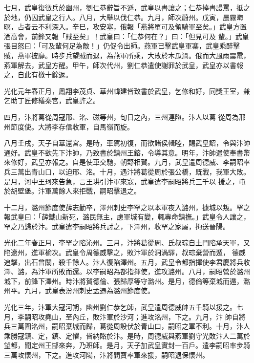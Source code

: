 \begin{pinyinscope}
 七月，武皇復徵兵於幽州，劉仁恭辭旨不遜，武皇以書讓之；仁恭捧書謾罵，抵之於地，仍囚武皇之行人。八月，大舉以伐仁恭。九月，師次蔚州。戊寅，晨霧晦暝，占者云不利深入。辛巳，攻安塞，俄報「燕將單可及領騎軍至矣。」武皇方置酒高會，前鋒又報「賊至矣」！武皇曰：「仁恭何在？」曰：「但見可及
 輩。」武皇張目怒曰：「可及輩何足為敵！」仍促令出師。燕軍已擊武皇軍寨，武皇乘醉擊賊，燕軍披靡。時步兵望賊而退，為燕軍所乘，大敗於木瓜澗。俄而大風雨震電，燕軍解去，武皇方醒。甲午，師次代州，劉仁恭遣使謝罪於武皇，武皇亦以書報之，自此有檄十餘返。



 光化元年春正月，鳳翔李茂貞、華州韓建皆致書於武皇，乞修和好，同獎王室，兼乞助丁匠修繕秦宮，武皇許之。



 四月，汴將葛從周寇邢、洺、磁等州，旬日之內，三州連陷。汴人以葛
 從周為邢州節度使。大將李存信收軍，自馬嶺而旋。



 八月壬戌，天子自華還宮。是時，車駕初復，而欲諸侯輯睦，賜武皇詔，令與汴帥通好。武皇不欲先下汴帥，乃致書於鎮州王鎔，令導其意。明年，汴帥遣使奉書幣來修好，武皇亦報之。自是使車交馳，朝野相賀。九月，武皇遣周德威、李嗣昭率兵三萬出青山口，以迫邢、洺。十月，遇汴將葛從周於張公橋，既戰，我軍大敗。是月，河中王珂來告急，言王珙引汴軍來寇，武皇遣李嗣昭將兵三千以
 援之，屯於胡壁堡。汴軍萬餘人來拒戰，嗣昭擊退之。



 十二月，潞州節度使薛志勤卒，澤州刺史李罕之以本軍夜入潞州，據城以叛。罕之報武皇曰：「薛鐵山新死，潞民無主，慮軍城有變，輒專命鎮撫。」武皇令人讓之，罕之乃歸於汴。武皇遣李嗣昭將兵討之，下澤州，收罕之家屬，拘送晉陽。



 光化二年春正月，李罕之陷沁州。三月，汴將葛從周、氏叔琮自土門陷承天軍，又陷遼州，進軍榆次。武皇令周德威擊之，敗汴軍於洞渦驛，叔琮棄營而遁，
 德威追擊，出石曾關，殺千餘人。汴人復陷澤州。五月，武皇令都指揮使李君慶將兵收澤、潞，為汴軍所敗而還。以李嗣昭為都指揮使，進攻潞州。八月，嗣昭營於潞州城下，前鋒下澤州。時汴將賀德倫、張歸厚等守潞州。是月，德倫等棄城而遁，潞州平。九月，武皇表汾州刺史孟遷為潞州節度使。



 光化三年，汴軍大寇河朔，幽州劉仁恭乞師，武皇遣周德威帥五千騎以援之。七月，李嗣昭攻堯山，至內丘，敗汴軍於沙河；進攻洺州，下之。九月，汴
 帥自將兵三萬圍洺州，嗣昭棄城而歸，葛從周設伏於青山口，嗣昭之軍不利。十月，汴人乘勝寇鎮、定，鎮、定懼，皆納賂於汴。是時，周德威與燕軍劉守光敗汴人二萬於望都，聞定州王郜來奔，乃班師。是月，天子加武皇實封一百戶。遣李嗣昭率步騎三萬攻懷州，下之。進攻河陽，汴將閻寶率軍來援，嗣昭退保懷州。




\end{pinyinscope}
